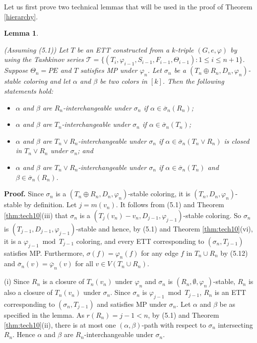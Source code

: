 \documentclass[11pt]{article}
\newtheorem{lemma}[theorem]{Lemma}
\newcommand{\TT}{\mathcal {T}}
\newcommand{\phibar}{\overline{\varphi}}
\newcommand{\phiv}{\varphi}
\begin{document}
Let us first prove two technical lemmas that will be used in the proof of Theorem \ref{hierarchy}. 

\begin{lemma}\label{interchange}

(Assuming (5.1)) Let $T$ be an ETT constructed from a $k$-triple $(G,e, \varphi)$ by using the Tashkinov series 
$\TT=\{(T_i, \phiv_{i-1}, S_{i-1}, F_{i-1}, \Theta_{i-1}): 1\le i \le n+1\}$. Suppose $\Theta_n=PE$ and $T$ satisfies
MP under $\varphi_n$. Let $\sigma_n$ be a $(T_n \oplus R_n, D_n,\varphi_n)$-stable coloring and let $\alpha$ and $\beta$
be two colors in $[k]$. Then the following statements hold:
\begin{itemize}
\vspace{-2mm}
\item[(i)] $\alpha$ and $\beta$ are $R_n$-interchangeable under $\sigma_n$ if $\alpha\in \overline{\sigma}_n(R_n)$;
\vspace{-2mm}
\item[(ii)] $\alpha$ and $\beta$ are $T_n$-interchangeable under $\sigma_n$ if $\alpha\in \overline{\sigma}_n(T_n)$;
\vspace{-2mm}
\item[(iii)] $\alpha$ and $\beta$ are $T_n\vee R_n$-interchangeable under $\sigma_n$ if $\alpha \in \overline{\sigma}_n
(T_n \vee R_n)$ is closed in $T_n\vee R_n$ under $\sigma_n$; and
\vspace{-2mm}
\item[(iv)] $\alpha$ and $\beta$ are $T_n\vee R_n$-interchangeable under $\sigma_n$ if $\alpha\in
\overline{\sigma}_n(T_n)$ and $\beta\in \overline{\sigma}_n(R_n)$.
\end{itemize}	
\end{lemma}	

{\bf Proof.} Since $\sigma_n$ is a $(T_n \oplus R_n, D_n,\varphi_n)$-stable coloring, it is  $(T_n, D_{n},\varphi_{n})$-stable 
by definition. Let $j=m(v_n)$. It follows from (5.1) and Theorem \ref{thm:tech10}(iii) that $\sigma_n$ is a
$(T_{j}(v_n)-v_n, D_{j-1},\varphi_{j-1})$-stable coloring. So $\sigma_n$ is $(T_{j-1}, D_{j-1}, \varphi_{j-1})$-stable and hence, 
by (5.1) and Theorem \ref{thm:tech10}(vi), it is a $\phiv_{j-1}\bmod T_{j-1}$ coloring, and every ETT corresponding to 
$(\sigma_n,T_{j-1})$ satisfies MP. Furthermore, $\sigma(f)=\varphi_n(f)$ 
for any edge $f$ in $T_n \cup R_n$ by (5.12) and $\overline{\sigma}_n(v)=\phibar_n(v)$ for all $v\in V(T_n \cup R_n)$. 

(i) Since $R_n$ is a closure of $T_n(v_n)$ under $\varphi_n$ and $\sigma_n$ is $(R_n, \emptyset, \varphi_n)$-stable,
$R_n$ is also a closure of $T_n(v_n)$ under $\sigma_n$. Since $\sigma_n$ is $\phiv_{j-1}\bmod T_{j-1}$,
$R_n$ is an ETT corresponding to $(\sigma_n,T_{j-1})$ and satisfies MP under $\sigma_n$. Let $\alpha$ and $\beta$ be as 
specified in the lemma. As $r(R_n)=j-1<n$, by (5.1) and Theorem \ref{thm:tech10}(ii), there is at most one $(\alpha, 
\beta)$-path with respect to $\sigma_n$ intersecting $R_n$. Hence $\alpha$ and $\beta$ are $R_n$-interchangeable under $\sigma_n$. 
\end{document}
